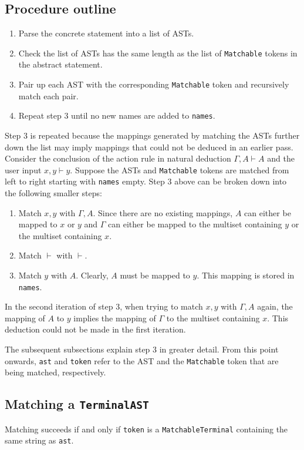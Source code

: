 \subsection{Procedure outline}
\label{matching:procedure}
\begin{enumerate}
    \item Parse the concrete statement into a list of ASTs.
    \item Check the list of ASTs has the same length as the list of \lstinline{Matchable} tokens in the abstract statement.
    \item Pair up each AST with the corresponding \lstinline{Matchable} token and recursively match each pair.
    \item Repeat step 3 until no new names are added to \lstinline{names}.
\end{enumerate}
Step 3 is repeated because the mappings generated by matching the ASTs further down the list may imply mappings that could not be deduced in an earlier pass. Consider the conclusion of the action rule in natural deduction $\Gamma, A \vdash A$ and the user input $x, y \vdash y$. Suppose the ASTs and \lstinline{Matchable} tokens are matched from left to right starting with \lstinline{names} empty. Step 3 above can be broken down into the following smaller steps:
\begin{enumerate}
    \item Match $x, y$ with $\Gamma, A$. Since there are no existing mappings, $A$ can either be mapped to $x$ or $y$ and $\Gamma$ can either be mapped to the multiset containing $y$ or the multiset containing $x$.
    \item Match $\vdash$ with $\vdash$.
    \item Match $y$ with $A$. Clearly, $A$ must be mapped to $y$. This mapping is stored in \lstinline{names}.
\end{enumerate}
In the second iteration of step 3, when trying to match $x, y$ with $\Gamma, A$ again, the mapping of $A$ to $y$ implies the mapping of $\Gamma$ to the multiset containing $x$. This deduction could not be made in the first iteration.

The subsequent subsections explain step 3 in greater detail. From this point onwards, \lstinline{ast} and \lstinline{token} refer to the AST and the \lstinline{Matchable} token that are being matched, respectively.

\subsection{Matching a \texorpdfstring{\lstinline{TerminalAST}}{TerminalAST}}
Matching succeeds if and only if \lstinline{token} is a \lstinline{MatchableTerminal} containing the same string as \lstinline{ast}.

